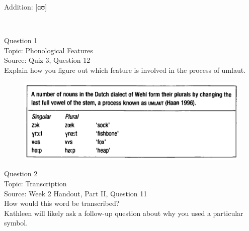 \documentclass[12pt]{article}
\begin{document}
Addition: {[ɑʊ]}


\newpage

\begin{center}
\textbf{{\color{red}{\HUGE END OF EXAM}}}\\

\end{center}
\newpage

\begin{center}
\textbf{{\color{blue}{\HUGE START OF EXAM\\}}}

\textbf{{\color{blue}{\HUGE Student ID: 92054\\}}}

\textbf{{\color{blue}{\HUGE 4:10\\}}}

\end{center}
\newpage

{\large Question 1}\\

Topic: Phonological Features\\
Source: Quiz 3, Question 12\\

Explain how you figure out which feature is involved in the process of umlaut.\\

\begin{figure}[H]
\includegraphics{../images/dutch.png}
\end{figure}

\newpage

{\large Question 2}\\

Topic: Transcription\\
Source: Week 2 Handout, Part II, Question 11\\

How would this word be transcribed?\\ Kathleen will likely ask a follow-up question about why you used a particular symbol.\\
\end{document}
